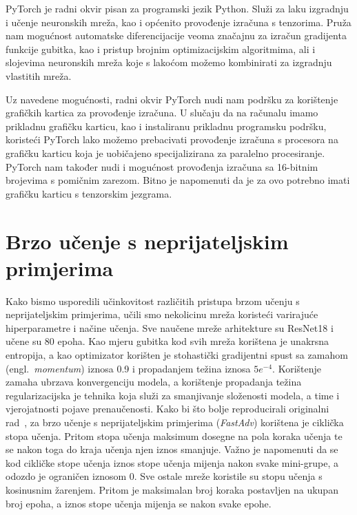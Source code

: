 \documentclass[times, utf8, zavrsni, numeric]{fer}
\begin{document}
PyTorch je radni okvir pisan za programski jezik Python.
Služi za laku izgradnju i učenje neuronskih mreža, kao i općenito provođenje izračuna s tenzorima.
Pruža nam mogućnost automatske diferencijacije veoma značajnu za izračun gradijenta funkcije gubitka, kao i pristup brojnim optimizacijskim algoritmima, 
ali i slojevima neuronskih mreža koje s lakoćom možemo kombinirati za izgradnju vlastitih mreža.

Uz navedene mogućnosti, radni okvir PyTorch nudi nam podršku za korištenje grafičkih kartica za provođenje izračuna.
U slučaju da na računalu imamo prikladnu grafičku karticu, kao i instaliranu prikladnu programsku podršku, 
koristeći PyTorch lako možemo prebacivati provođenje izračuna s procesora na grafičku karticu koja je uobičajeno specijalizirana za paralelno procesiranje.
PyTorch nam također nudi i mogućnost provođenja izračuna sa 16-bitnim brojevima s pomičnim zarezom. Bitno je napomenuti da je za ovo potrebno imati grafičku karticu s tenzorskim jezgrama.

\section{Brzo učenje s neprijateljskim primjerima}

Kako bismo usporedili učinkovitost različitih pristupa brzom učenju s neprijateljskim primjerima, učili smo nekolicinu mreža koristeći varirajuće hiperparametre i načine učenja.
Sve naučene mreže arhitekture su ResNet18 i učene su 80 epoha. Kao mjeru gubitka kod svih mreža korištena je unakrsna entropija,
a kao optimizator korišten je stohastički gradijentni spust sa zamahom (engl.\ \textit{momentum}) iznosa 0.9 i propadanjem težina iznosa $5e^{-4}$.
Korištenje zamaha ubrzava konvergenciju modela, a korištenje propadanja težina regularizacijska je tehnika koja služi za smanjivanje složenosti modela, a time i vjerojatnosti pojave prenaučenosti.
Kako bi što bolje reproducirali originalni rad~\cite{wong2020fast}, 
za brzo učenje s neprijateljskim primjerima (\textit{FastAdv}) korištena je ciklička stopa učenja. Pritom stopa učenja maksimum dosegne na pola koraka učenja te se nakon toga do kraja učenja njen iznos smanjuje. 
Važno je napomenuti da se kod cikličke stope učenja iznos stope učenja mijenja nakon svake mini-grupe, a odozdo je ograničen iznosom 0.
Sve ostale mreže koristile su stopu učenja s kosinusnim žarenjem. Pritom je maksimalan broj koraka postavljen na ukupan broj epoha, a iznos stope učenja mijenja se nakon svake epohe.
\end{document}
